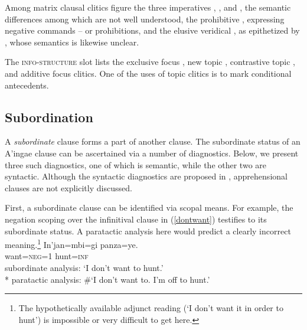 \documentclass[output=paper,colorlinks,citecolor=brown]{langscibook}
\begin{document}
Among matrix clausal clitics figure the three imperatives , , and , the semantic differences among which are not well understood, the prohibitive , expressing negative commands -- or prohibitions, and the elusive veridical , as epithetized by \citet[35]{fischerhengeveld}, whose semantics is likewise unclear.

{The \textsc{info-structure} slot lists the exclusive focus , new topic , contrastive topic , and additive focus  clitics. One of the uses of topic clitics is to mark conditional antecedents.}




\subsection{{Subordination}} \label{sec:subordination}

A \textit{subordinate} clause
forms a part of another clause. The subordinate status of an A'ingae clause can be ascertained via a number of diagnostics. Below, we present three such diagnostics, one of which is semantic, while the other two are syntactic. Although the syntactic diagnostics are proposed in \citet{fischer2011cofan}, apprehensional clauses are not explicitly discussed.

First, a subordinate clause can be identified via scopal means. For example, the negation scoping over the infinitival clause in (\ref{dontwant}) testifies to its subordinate status. A paratactic analysis here would predict a clearly incorrect meaning.\footnote{The hypothetically available adjunct reading (`I don't want it in order to hunt') is impossible or very difficult to get here.} 
    \ea \label{dontwant} %
    \gll In'jan=mbi=gi  {\ob}panza=ye.{\cb}\\
         want=\textsc{neg=1} hunt=\textsc{inf} \\
    \glt subordinate analysis: `I don't want to hunt.' \\*
         paratactic analysis: \#`I don't want to. I'm off to hunt.' 
    \z
\end{document}
